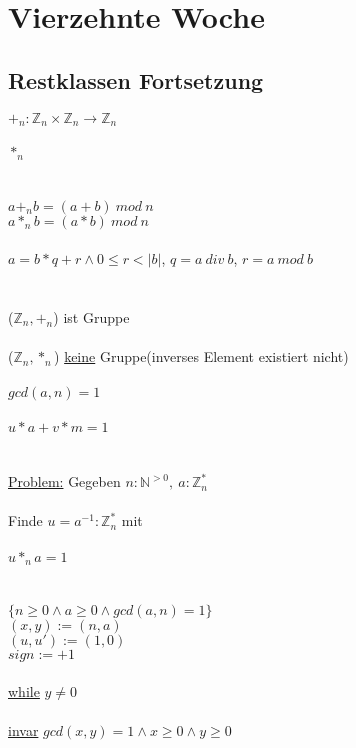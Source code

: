 \documentclass[18pt,a4paper]{article}
\newcommand{\tab}{\hspace*{2em}}
\begin{document}
\section{Vierzehnte Woche}

\subsection{Restklassen Fortsetzung}

$+_n : \mathbb{Z}_n \times \mathbb{Z}_n \rightarrow \mathbb{Z}_n$\\
\\
$*_n$\\
\\
\\
$a +_n b = (a+b) \: mod\: n$\\
$a *_n b = (a * b)\: mod\: n$\\
\\
$a = b* q + r \wedge 0 \leqslant r < |b|$, \tab $q = a\: div\: b$, \tab $r = a\:mod\: b$\\
\\
\\
($\mathbb{Z}_n, +_n$) ist Gruppe\\
\\
($\mathbb{Z}_n, *_n$) \uline{keine} Gruppe\tab (inverses Element existiert nicht)\\
\\
$gcd(a,n) =1$\\
\\
$u*a + v*m =1$\\
\\
\\
\uline{Problem:} Gegeben $n:\mathbb{N}^{>0},\:a:\mathbb{Z}_{n}^{*}$\\
\\
\tab Finde $u = a^{-1} : \mathbb{Z}_{n}^{*} $ mit\\
\\
\tab $u *_n a =1$\\
\\
\\
$\{n\geqslant 0 \wedge a\geqslant 0 \wedge gcd(a,n) = 1\}$\\
\tab $(x,y) := (n,a)$\\
\tab $(u,u') := (1,0)$\\
\tab $sign := +1$\\
\\
\uline{while} $y \neq 0$\\
\\
\tab \uline{invar} $gcd(x,y) = 1 \wedge x\geqslant 0 \wedge y\geqslant 0$\\
\end{document}
